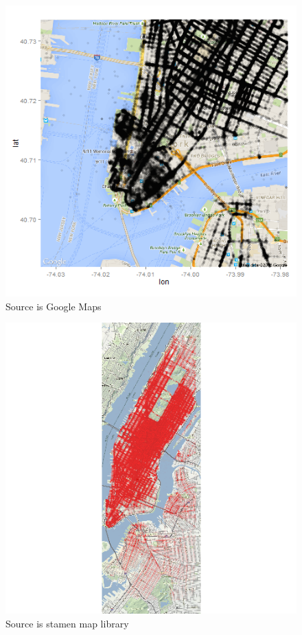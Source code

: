 \documentclass[]{article}
\begin{document}
\begin{figure}[htbp]
\centering
\includegraphics{R/pickup.png}
\caption{Source is Google Maps}
\end{figure}

\begin{figure}[htbp]
\centering
\includegraphics{R/dropoff.png}
\caption{Source is stamen map library}
\end{figure}
\end{document}
